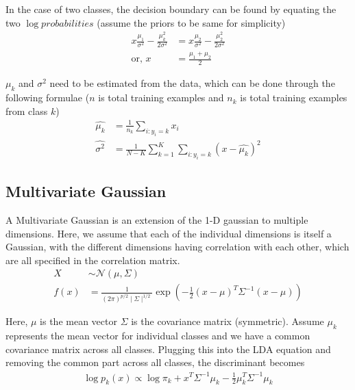 \documentclass[../statistical_learning_notes.tex]{subfiles}
\begin{document}
    In the case of two classes, the decision boundary can be found by equating the two $\log probabilities$ (assume the priors to be same for simplicity)
    \begin{align*}
        x\frac{\mu_{1}}{\sigma^{2}} - \frac{\mu_{k}^{2}}{2\sigma^{2}} &= x\frac{\mu_{2}}{\sigma^{2}} - \frac{\mu_{2}^{2}}{2\sigma^{2}} \\
        \text{or, } x &= \frac{\mu_{1} + \mu_{2}}{2} 
    \end{align*}

    $\mu_{k}$ and $\sigma^{2}$ need to be estimated from the data, which can be done through the following formulae ($n$ is total training examples and $n_{k}$ is total training examples from class $k$)
    \begin{align*}
        \hat{\mu_{k}} &= \frac{1}{n_{k}} \sum_{i:y_{i}=k}x_{i}\\
        \hat{\sigma^{2}} &= \frac{1}{N - K}\sum_{k=1}^{K}\sum_{i:y_{i}=k}(x-\hat{\mu_{k}})^{2}
    \end{align*}

    \subsection{Multivariate Gaussian}
    A Multivariate Gaussian is an extension of the 1-D gaussian to multiple dimensions. Here, we assume that each of the individual dimensions is itself a Gaussian, with the different dimensions having correlation with each other, which are all specified in the correlation matrix.
    \begin{align*}
        X &\sim \mathcal{N}(\mu, \Sigma) \\
        f(x) &= \frac{1}{(2\pi)^{p/2}\mid \Sigma \mid^{1/2}} \exp(-\frac{1}{2}(x-\mu)^{T}\Sigma^{-1}(x-\mu))
    \end{align*}

    Here, $\mu$ is the mean vector $\Sigma$ is the covariance matrix (symmetric). \newline 
    Assume $\mu_{k}$ represents the mean vector for individual classes and we have a common covariance matrix across all classes. Plugging this into the LDA equation and removing the common part across all classes, the discriminant becomes
    \begin{align*}
        \log{p_{k}(x)} \propto \log{\pi_{k}} + x^{T}\Sigma^{-1}\mu_{k} - \frac{1}{2}\mu_{k}^{T}\Sigma^{-1}\mu_{k}    
    \end{align*}
\end{document}

